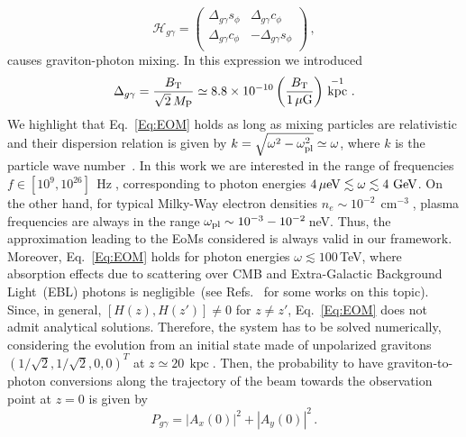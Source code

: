 \documentclass[twocolumn,superscriptaddress,floatfix,preprintnumbers, nofootinbib,hyperref]{revtex4-2}
\DeclareMathOperator{\cm}{cm}
\DeclareMathOperator{\Hz}{Hz}
\DeclareMathOperator{\GeV}{GeV}
\DeclareMathOperator{\kpc}{kpc}
\begin{document}
\begin{equation}
    \mathcal{H}_{g\gamma}=\begin{pmatrix}
        \Delta_{g\gamma} s_\phi   &\Delta_{g\gamma} c_\phi\\
        \Delta_{g\gamma} c_\phi   &-\Delta_{g\gamma} s_\phi\\
    \end{pmatrix}\,,
\end{equation}
causes graviton-photon mixing. 
In this expression we introduced
\begin{equation}
    \Delta_{g\gamma}=\frac{B_{\rm T}}{\sqrt{2}\,M_{\rm P}}\simeq8.8\times10^{-10}\left(\frac{B_{\rm T}}{1\,\mu{\rm G}}\right)\,\kpc^{-1}\,.
\end{equation}
We highlight that Eq.~\eqref{Eq:EOM}
holds as long as mixing particles are relativistic and their dispersion relation is given by $k=\sqrt{\omega^2-\omega_{\rm pl}^2}\simeq\omega$, where $k$ is the particle wave number~\cite{Raffelt:1987im,Battye:2019aco}. In this work we are interested in the range of frequencies $f\in[10^9,10^{26}]\,\Hz$, corresponding to photon energies $4\,\mu{\rm eV}\lesssim\omega\lesssim4\,\GeV$. On the other hand, for typical Milky-Way electron densities ${n_e\sim10^{-2}\,\cm^{-3}}$, plasma frequencies are always in the range $\omega_{\rm pl}\sim10^{-3}-10^{-2}\,$neV. Thus, the approximation leading to the
EoMs considered is always valid in our framework. Moreover, Eq.~\eqref{Eq:EOM} holds for photon energies $\omega\lesssim100\,$TeV, where absorption effects due to scattering over CMB and Extra-Galactic Background Light~(EBL) photons is negligible~(see Refs.~\cite{Mirizzi:2009aj,Dobrynina:2014qba,Kartavtsev:2016doq} for some works on this topic).\\
Since, in general, $\left[H(z),H(z')\right]\neq0$ for $z\neq z'$, Eq.~\eqref{Eq:EOM} does not admit analytical solutions. Therefore, the system has to be solved numerically, considering the evolution from an initial state made of unpolarized gravitons $(1/\sqrt{2},1/\sqrt{2},0,0)^{T}$ at $z\simeq20\,\kpc$. Then, the probability to have graviton-to-photon conversions along the trajectory of the beam towards the observation point at $z=0$ is given by
\begin{equation}
    P_{g\gamma}=|A_x(0)|^2+|A_y(0)|^2\,.
\end{equation}
\end{document}
